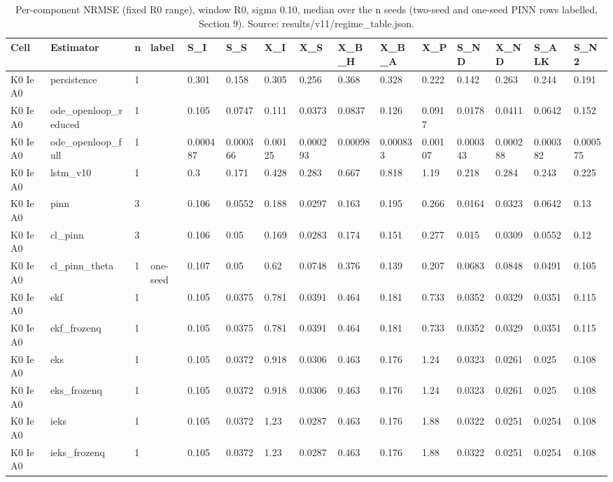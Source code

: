 \begin{table}[t]
\centering
\caption{Per-component NRMSE (fixed R0 range), window R0, sigma 0.10, median over the n seeds (two-seed and one-seed PINN rows labelled, Section 9). Source: results/v11/regime\_table.json.}
\label{tab:si-components-R0}
\footnotesize
\begin{tabular}{lllllllllllllll}
\toprule
Cell & Estimator & n & label & S\_I & S\_S & X\_I & X\_S & X\_B\_H & X\_B\_A & X\_P & S\_ND & X\_ND & S\_ALK & S\_N2 \\
\midrule
K0 Ie A0 & persistence & 1 &  & 0.301 & 0.158 & 0.305 & 0.256 & 0.368 & 0.328 & 0.222 & 0.142 & 0.263 & 0.244 & 0.191 \\
K0 Ie A0 & ode\_openloop\_reduced & 1 &  & 0.105 & 0.0747 & 0.111 & 0.0373 & 0.0837 & 0.126 & 0.0917 & 0.0178 & 0.0411 & 0.0642 & 0.152 \\
K0 Ie A0 & ode\_openloop\_full & 1 &  & 0.000487 & 0.000366 & 0.00125 & 0.000293 & 0.00098 & 0.000833 & 0.00107 & 0.000343 & 0.000288 & 0.000382 & 0.000575 \\
K0 Ie A0 & lstm\_v10 & 1 &  & 0.3 & 0.171 & 0.428 & 0.283 & 0.667 & 0.818 & 1.19 & 0.218 & 0.284 & 0.243 & 0.225 \\
K0 Ie A0 & pinn & 3 &  & 0.106 & 0.0552 & 0.188 & 0.0297 & 0.163 & 0.195 & 0.266 & 0.0164 & 0.0323 & 0.0642 & 0.13 \\
K0 Ie A0 & cl\_pinn & 3 &  & 0.106 & 0.05 & 0.169 & 0.0283 & 0.174 & 0.151 & 0.277 & 0.015 & 0.0309 & 0.0552 & 0.12 \\
K0 Ie A0 & cl\_pinn\_theta & 1 & one-seed & 0.107 & 0.05 & 0.62 & 0.0748 & 0.376 & 0.139 & 0.207 & 0.0683 & 0.0848 & 0.0491 & 0.105 \\
K0 Ie A0 & ekf & 1 &  & 0.105 & 0.0375 & 0.781 & 0.0391 & 0.464 & 0.181 & 0.733 & 0.0352 & 0.0329 & 0.0351 & 0.115 \\
K0 Ie A0 & ekf\_frozenq & 1 &  & 0.105 & 0.0375 & 0.781 & 0.0391 & 0.464 & 0.181 & 0.733 & 0.0352 & 0.0329 & 0.0351 & 0.115 \\
K0 Ie A0 & eks & 1 &  & 0.105 & 0.0372 & 0.918 & 0.0306 & 0.463 & 0.176 & 1.24 & 0.0323 & 0.0261 & 0.025 & 0.108 \\
K0 Ie A0 & eks\_frozenq & 1 &  & 0.105 & 0.0372 & 0.918 & 0.0306 & 0.463 & 0.176 & 1.24 & 0.0323 & 0.0261 & 0.025 & 0.108 \\
K0 Ie A0 & ieks & 1 &  & 0.105 & 0.0372 & 1.23 & 0.0287 & 0.463 & 0.176 & 1.88 & 0.0322 & 0.0251 & 0.0254 & 0.108 \\
K0 Ie A0 & ieks\_frozenq & 1 &  & 0.105 & 0.0372 & 1.23 & 0.0287 & 0.463 & 0.176 & 1.88 & 0.0322 & 0.0251 & 0.0254 & 0.108 \\

\end{tabular}
\end{table}
